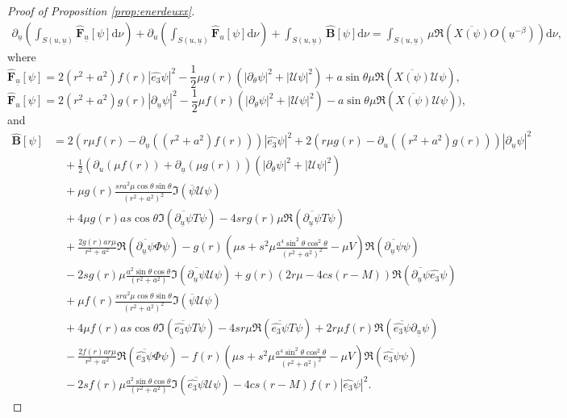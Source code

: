 \documentclass[reqno]{amsart}
\numberwithin{equation}{section}
\newcommand{\intS}{\int_{S(u,\ubar)}}
\newcommand{\Real}{\mathfrak{R}}
\newcommand{\ubar}{{\underline{u}}}
\newcommand{\dee}{\mathrm{d}}
\theoremstyle{plain}
\theoremstyle{definition}
\theoremstyle{remark}
\numberwithin{equation}{section}
\begin{document}
\begin{proof}[Proof of Proposition \ref{prop:enerdeuxx}]
\begin{align}\label{eqn:dudubarII}
    \partial_\ubar\left(\int_{{S(u,\ubar)}}\widehat{\mathbf{F}}_\ubar[\psi]\dee\nu\right)+\partial_u\left(\int_{{S(u,\ubar)}}\widehat{\mathbf{F}}_u[\psi]\dee\nu\right)+\int_{{S(u,\ubar)}}\widehat{\mathbf{B}}[\psi]\dee\nu=\intS\mu\Real({\overline{X(\psi)}O(\ubar^{-\beta})})\dee\nu,
\end{align}
where 
$$\widehat{\mathbf{F}}_\ubar[\psi]=2(r^2+a^2)f(r)|\widehat{e_3}\psi|^2-\frac{1}{2}\mu g(r)(|\partial_\theta\psi|^2+|\mathcal{U}\psi|^2)+a\sin\theta \mu \mathfrak{R}(\overline{X(\psi)}\mathcal{U}\psi),$$
$$\widehat{\mathbf{F}}_u[\psi]=2(r^2+a^2)g(r)|\partial_\ubar\psi|^2-\frac{1}{2}\mu f(r)(|\partial_\theta\psi|^2+|\mathcal{U}\psi|^2)-a\sin\theta \mu \mathfrak{R}(\overline{X(\psi)}\mathcal{U}\psi)),$$
and
\begin{align*}
    \widehat{\mathbf{B}}[\psi]&=2(r\mu f(r)-\partial_\ubar((r^2+a^2)f(r)))|\widehat{e_3}\psi|^2+2(r\mu g(r)-\partial_u((r^2+a^2)g(r)))|\partial_\ubar\psi|^2\\
    &\quad +\frac{1}{2}(\partial_u(\mu f(r))+\partial_\ubar(\mu g(r)))(|\partial_\theta\psi|^2+|\mathcal{U}\psi|^2)\\
    &\quad+\mu g(r)\frac{sra^2\mu\cos\theta\sin\theta}{(r^2+a^2)^2}\mathfrak{I}(\overline{\psi} \mathcal{U}\psi)\\
    &\quad+4\mu g(r)as\cos\theta\mathfrak{I}(\overline{\partial_\ubar\psi}T\psi)-4srg(r)\mu\mathfrak{R}(\overline{\partial_\ubar\psi}T\psi)\\
    &\quad+\frac{2g(r)ar\mu}{r^2+a^2}\mathfrak{R}(\overline{\partial_\ubar\psi}\Phi\psi)-g(r)\left(\mu s+s^2\mu\frac{a^4\sin^2\theta\cos^2\theta}{(r^2+a^2)^2}-\mu V\right)\mathfrak{R}(\overline{\partial_\ubar\psi}\psi)\\
    &\quad-2sg(r)\mu\frac{a^2\sin\theta\cos\theta}{(r^2+a^2)}\mathfrak{I}(\overline{\partial_\ubar\psi}\mathcal{U}\psi)+g(r)(2r\mu-4cs(r-M))\Real(\overline{\partial_\ubar\psi} \widehat{e_3}\psi)\\
    &\quad+\mu f(r)\frac{sra^2\mu\cos\theta\sin\theta}{(r^2+a^2)^2}\mathfrak{I}(\overline{\psi} \mathcal{U}\psi)\\
    &\quad+4\mu f(r)as\cos\theta\mathfrak{I}(\overline{\widehat{e_3}\psi}T\psi)-4sr\mu\mathfrak{R}(\overline{\widehat{e_3}\psi}T\psi)+2 r\mu f(r)\mathfrak{R}(\overline{\widehat{e_3}\psi}\partial_\ubar\psi)\\
    &\quad-\frac{2f(r)ar\mu}{r^2+a^2}\mathfrak{R}(\overline{ \widehat{e_3} \psi}\Phi\psi)-f(r)\left(\mu s+s^2\mu\frac{a^4\sin^2\theta\cos^2\theta}{(r^2+a^2)^2}-\mu V\right)\mathfrak{R}(\overline{ \widehat{e_3} \psi}\psi)\\
    &\quad-2sf(r)\mu\frac{a^2\sin\theta\cos\theta}{(r^2+a^2)}\mathfrak{I}(\overline{ \widehat{e_3} \psi}\mathcal{U}\psi)-4cs(r-M)f(r)|\widehat{e_3}\psi|^2.
\end{align*}



\end{proof}
\end{document}
